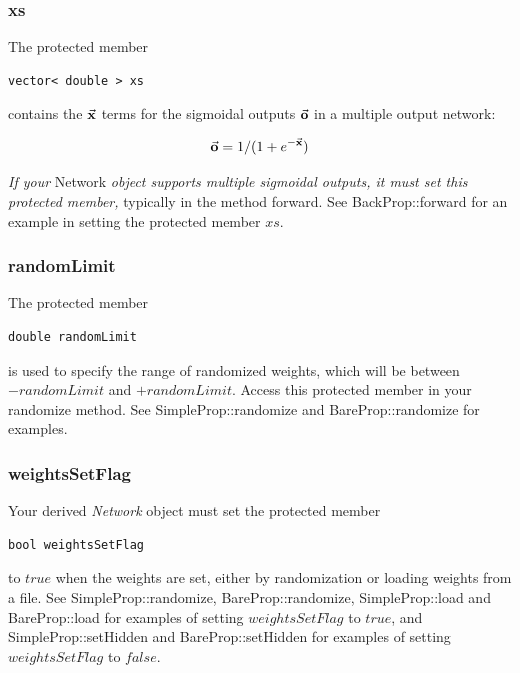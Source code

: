 \documentclass{report}
\begin{document}
\subsubsection{xs}

The protected member

\begin{verbatim}
vector< double > xs
\end{verbatim}

contains the $\vec{\bf x}$ terms for the sigmoidal outputs
$\vec{\bf o}$ in a multiple output network:

\begin{displaymath}
\vec{\bf o} = 1/(1+e^{-\vec{\bf x}})
\end{displaymath}

{\em If your} Network {\em object supports multiple sigmoidal outputs,
it must set this protected member,} typically in the method forward.
 See BackProp::forward for an example in
setting the protected member $xs$.

\subsubsection{randomLimit}

The protected member

\begin{verbatim}
double randomLimit
\end{verbatim}

is used to specify the range of randomized weights, which will be
between $- randomLimit$ and $+ randomLimit$.  Access this protected
member in your randomize method.  See SimpleProp::randomize and
BareProp::randomize for examples.

\subsubsection{weightsSetFlag}

Your derived {\em Network} object must set the protected member

\begin{verbatim}
bool weightsSetFlag
\end{verbatim}

to $true$ when the weights are set, either by randomization or loading
weights from a file.  See SimpleProp::randomize, BareProp::randomize,
SimpleProp::load and BareProp::load for examples of setting
$weightsSetFlag$ to $true$, and SimpleProp::setHidden and
BareProp::setHidden for examples of setting $weightsSetFlag$ to
$false$.
\end{document}
